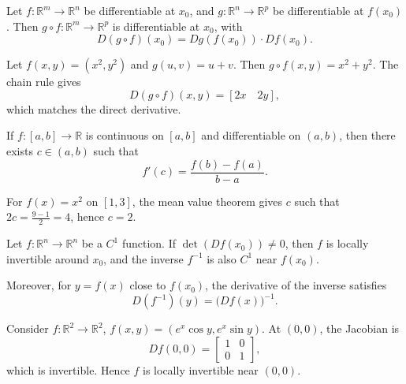 \begin{proposition}
Let $f:\mathbb{R}^m\to \mathbb{R}^n$ be differentiable at $x_0$, and $g:\mathbb{R}^n\to \mathbb{R}^p$ be differentiable at $f(x_0)$.  
Then $g\circ f:\mathbb{R}^m\to \mathbb{R}^p$ is differentiable at $x_0$, with
\begin{equation}
D(g\circ f)(x_0) = Dg(f(x_0)) \cdot Df(x_0).
\end{equation}
\end{proposition}

\begin{example}
Let $f(x,y)=(x^2,y^2)$ and $g(u,v)=u+v$. Then $g\circ f(x,y)=x^2+y^2$.  
The chain rule gives
\begin{equation}
D(g\circ f)(x,y)= [2x \quad 2y],
\end{equation}
which matches the direct derivative.
\end{example}

\begin{theorem}
If $f:[a,b]\to \mathbb{R}$ is continuous on $[a,b]$ and differentiable on $(a,b)$, then there exists $c\in (a,b)$ such that
\begin{equation}
f'(c) = \frac{f(b)-f(a)}{b-a}.
\end{equation}
\end{theorem}

\begin{example}
For $f(x)=x^2$ on $[1,3]$, the mean value theorem gives $c$ such that $2c=\frac{9-1}{2}=4$, hence $c=2$.
\end{example}

\begin{theorem}
Let $f:\mathbb{R}^n\to \mathbb{R}^n$ be a $C^1$ function.  
If $\det(Df(x_0))\neq 0$, then $f$ is locally invertible around $x_0$, and the inverse $f^{-1}$ is also $C^1$ near $f(x_0)$.  

Moreover, for $y=f(x)$ close to $f(x_0)$, the derivative of the inverse satisfies
\begin{equation}
D(f^{-1})(y) = \big(Df(x)\big)^{-1}.
\end{equation}
\end{theorem}


\begin{example}
Consider $f:\mathbb{R}^2\to \mathbb{R}^2$, $f(x,y)=(e^x \cos y, e^x \sin y)$.  
At $(0,0)$, the Jacobian is 
\begin{equation}
Df(0,0)=\begin{bmatrix}1&0\\0&1\end{bmatrix},
\end{equation}
which is invertible. Hence $f$ is locally invertible near $(0,0)$.
\end{example}

